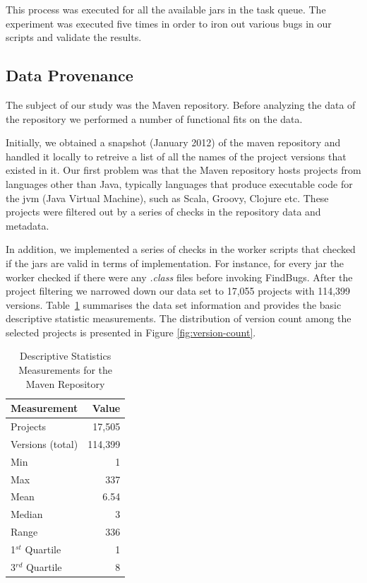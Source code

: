 \documentclass[conference]{IEEEtran}
\begin{document}
This process was executed for all the available {\sc jar}s in the task queue.
The experiment was executed five times in order to iron out various bugs in
our scripts and validate the results. 

\subsection{Data Provenance}
\label{sec:data}

The subject of our study was the Maven repository. Before
analyzing the data of the repository we performed a
number of functional fits on the data. 

Initially, we obtained a snapshot (January 2012) of the maven repository and
handled it locally to retreive a list of all the names of the project versions
that existed in it. Our first problem was that the Maven repository
hosts projects from languages other than Java, typically languages that produce
executable code for the {\sc jvm} (Java Virtual Machine), such as Scala, Groovy,
Clojure etc. These projects were filtered out by a series of checks in
the repository data and metadata.

In addition, we implemented a series of checks in the worker scripts that
checked if the {\sc jar}s are valid in terms of implementation. For instance,
for every {\sc jar} the worker checked if there were any {\it .class} files
before invoking FindBugs. After the project filtering we narrowed down
our data set to 17,055 projects with 114,399 versions.
Table~\ref{tbl:repository} summarises the data set information and
provides the basic descriptive statistic measurements. The distribution of version
count among the selected projects is presented in Figure \ref{fig:version-count}.

\begin{table}
\centering
\caption{Descriptive Statistics Measurements for the Maven Repository}
\label{tbl:repository}
\begin{tabular}{l r}
\hline
Measurement & Value\\
 \hline
Projects & 17,505\\
Versions (total) & 114,399\\
Min & 1\\
Max & 337\\
Mean & 6.54\\
Median & 3\\
Range & 336\\
1$^{st}$ Quartile & 1\\
3$^{rd}$ Quartile & 8\\
\hline
\end{tabular}
\end{table}
\end{document}
